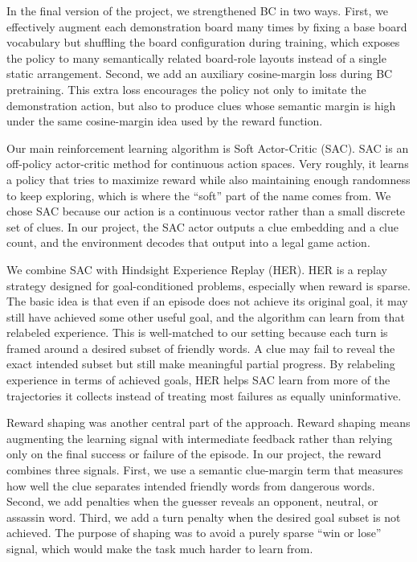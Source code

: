\documentclass[9pt]{article}
\begin{document}
In the final
version of the project, we strengthened BC in two ways. First, we
effectively augment each demonstration board many times by fixing a base
board vocabulary but shuffling the board configuration during training,
which exposes the policy to many semantically related board-role layouts
instead of a single static arrangement. Second, we add an auxiliary
cosine-margin loss during BC pretraining. This extra loss encourages the
policy not only to imitate the demonstration action, but also to produce
clues whose semantic margin is high under the same cosine-margin idea
used by the reward function.

Our main reinforcement learning algorithm is Soft Actor-Critic (SAC).
SAC is an off-policy actor-critic method for continuous action spaces.
Very roughly, it learns a policy that tries to maximize reward while
also maintaining enough randomness to keep exploring, which is where the
``soft'' part of the name comes from. We chose SAC because our action is
a continuous vector rather than a small discrete set of clues. In our project, the SAC actor
outputs a clue embedding and a clue count, and the environment decodes
that output into a legal game action.

We combine SAC with Hindsight Experience Replay (HER). HER is a replay
strategy designed for goal-conditioned problems, especially when reward
is sparse. The basic idea is that even if an episode does not achieve
its original goal, it may still have achieved some other useful goal,
and the algorithm can learn from that relabeled experience. This is
well-matched to our setting because each turn is framed around a desired
subset of friendly words. A clue may fail to reveal the exact intended
subset but still make meaningful partial progress. By relabeling
experience in terms of achieved goals, HER helps SAC learn from more of
the trajectories it collects instead of treating most failures as
equally uninformative.

Reward shaping was another central part of the approach. Reward shaping
means augmenting the learning signal with intermediate feedback rather
than relying only on the final success or failure of the episode. In our
project, the reward combines three signals. First, we use a semantic
clue-margin term that measures how well the clue separates intended
friendly words from dangerous words. Second, we add penalties when the
guesser reveals an opponent, neutral, or assassin word. Third, we add a
turn penalty when the desired goal subset is not achieved. The purpose
of shaping was to avoid a purely sparse ``win or lose'' signal, which
would make the task much harder to learn from.
\end{document}
